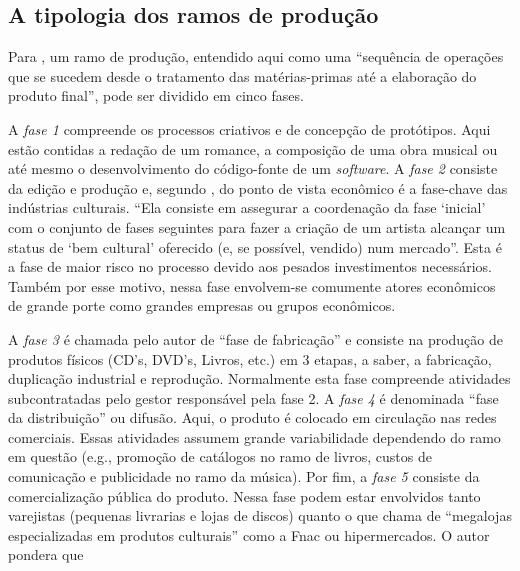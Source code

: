 \documentclass[a4paper, 12pt, openright, oneside, german, french, english, brazil]{abntex2}
\begin{document}
	\subsection{A tipologia dos ramos de produção}
	
	Para , um ramo de produção, entendido aqui como uma ``sequência de operações que se sucedem desde o tratamento das matérias-primas até a elaboração do produto final'', pode ser dividido em cinco fases. 
	
	A \textit{fase 1} compreende os processos criativos e de concepção de protótipos. Aqui estão contidas a redação de um romance, a composição de uma obra musical ou até mesmo o desenvolvimento do código-fonte de um \textit{software}. A \textit{fase 2} consiste da edição e produção e, segundo , do ponto de vista econômico é a fase-chave das indústrias culturais. ``Ela consiste em assegurar a coordenação da fase `inicial' com o conjunto de fases seguintes para fazer a criação de um artista alcançar um status de `bem cultural' oferecido (e, se possível, vendido) num mercado''. Esta é a fase de maior risco no processo devido aos pesados investimentos necessários. Também por esse motivo, nessa fase envolvem-se comumente atores econômicos de grande porte como grandes empresas ou grupos econômicos.
	
	A \textit{fase 3} é chamada pelo autor de ``fase de fabricação'' e consiste na produção de produtos físicos (CD's, DVD's, Livros, etc.) em 3 etapas, a saber, a fabricação, duplicação industrial e reprodução. Normalmente esta fase compreende atividades subcontratadas pelo gestor responsável pela fase 2. A \textit{fase 4} é denominada ``fase da distribuição'' ou difusão. Aqui, o produto é colocado em circulação nas redes comerciais. Essas atividades assumem grande variabilidade dependendo do ramo em questão (e.g., promoção de catálogos no ramo de livros, custos de comunicação e publicidade no ramo da música). Por fim, a \textit{fase 5} consiste da comercialização pública do produto. Nessa fase podem estar envolvidos tanto varejistas (pequenas livrarias e lojas de discos) quanto o que  chama de ``megalojas especializadas em produtos culturais'' como a Fnac ou hipermercados. O autor pondera que
	
\end{document}
